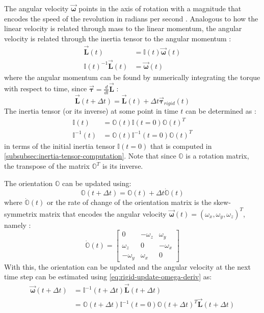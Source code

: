 \documentclass[oneside, a4paper]{book}
\newcommand\vek[1]{\vec{\bm{#1}}}
\newcommand\br[1]{\left(#1\right)}
\begin{document}
    The angular velocity $\vek{\omega}$ points in the axis of rotation with a magnitude that encodes the speed of the revolution in radians per second \autocite{physically-based-rigids}. Analogous to how the linear velocity is related through mass to the linear momentum, the angular velocity is related through the inertia tensor to the angular momentum \autocite{classical-mechanics}:
    \begin{align}
      \vek{L}\br{t} &= \mathds{I}\br{t} \vek{\omega}\br{t}\\
      \mathds{I}\br{t}^{-1} \vek{L}\br{t} &=\vek{\omega}\br{t}\label{eq:rigid-update-omega-deriv}
    \end{align}
    where the angular momentum can be found by numerically integrating the torque with respect to time, since $\vek{\tau}=\frac{d}{dt}\vek{L}$ \autocite{physically-based-rigids}:
    \begin{equation}
      \vek{L}\br{t+\Delta t} = \vek{L}\br{t} + \Delta t \vek{\tau}_{rigid}\br{t}
    \end{equation}
    The inertia tensor (or its inverse) at some point in time $t$ can be determined as \autocite{physically-based-rigids}:
    \begin{align}
      \mathds{I}\br{t} &= \mathds{O}\br{t} \mathds{I}\br{t=0} \mathds{O}\br{t}^T\\
      \mathds{I}^{-1}\br{t} &= \mathds{O}\br{t} \mathds{I}^{-1}\br{t=0} \mathds{O}\br{t}^T
    \end{align}
    in terms of the initial inertia tensor $\mathds{I}\br{t=0}$ that is computed in \autoref{subsubsec:inertia-tensor-computation}. Note that since $\mathds{O}$ is a rotation matrix, the transpose of the matrix $\mathds{O}^T$ is its inverse. 

    The orientation $\mathds{O}$ can be updated using:
    \begin{equation}\label{eq:rigid-orientation-update}
      \mathds{O}\br{t+\Delta t} = \mathds{O}\br{t} + \Delta t \dot{\mathds{O}}\br{t}
    \end{equation}
    where $\dot{\mathds{O}}\br{t}$ or the rate of change of the orientation matrix is the skew-symmetrix matrix that encodes the angular velocity $\vek{\omega}\br{t} = \br{\omega_x, \omega_y, \omega_z}^T$, namely \autocite{physically-based-rigids}:
    \begin{equation}
      \dot{\mathds{O}}\br{t} = \begin{bmatrix}
        0&-\omega_z&\omega_y\\
        \omega_z&0&-\omega_x\\
        -\omega_y&\omega_x&0
      \end{bmatrix}
    \end{equation}
    With this, the orientation can be updated and the angular velocity at the next time step can be estimated using \autoref{eq:rigid-update-omega-deriv} as:
    \begin{align}\label{eq:rigid-update-omega}
      \vek{\omega}\br{t+\Delta t} &= \mathds{I}^{-1}\br{t+\Delta t} \vek{L}\br{t+\Delta t}\\
      &= \mathds{O}\br{t+\Delta t} \mathds{I}^{-1}\br{t=0} \mathds{O}\br{t+\Delta t}^T \vek{L}\br{t+\Delta t}
    \end{align}
\end{document}
